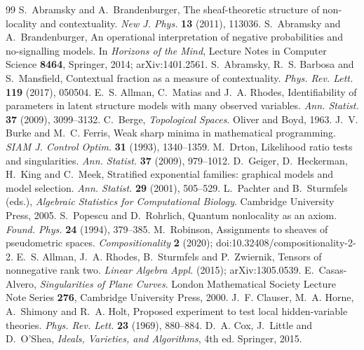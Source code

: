 \documentclass[11pt]{article}
\theoremstyle{definition}\newtheorem{definition}[theorem]{Definition}\newtheorem{remark}[theorem]{Remark}\newtheorem{example}[theorem]{Example}
\begin{document}
\par\endgroup
\begin{thebibliography}{99}\small
{} S.~Abramsky and A.~Brandenburger, The sheaf-theoretic structure of non-locality and
  contextuality. \emph{New J. Phys.} \textbf{13} (2011), 113036.
 S.~Abramsky and A.~Brandenburger, An operational interpretation of negative probabilities and
  no-signalling models. In \emph{Horizons of the Mind}, Lecture Notes in Computer Science \textbf{8464}, Springer, 2014;
  arXiv:1401.2561.
 S.~Abramsky, R.~S. Barbosa and S.~Mansfield, Contextual fraction as a measure of
  contextuality. \emph{Phys. Rev. Lett.} \textbf{119} (2017), 050504.
 E.~S. Allman, C.~Matias and J.~A. Rhodes, Identifiability of parameters in latent structure models with
  many observed variables. \emph{Ann. Statist.} \textbf{37} (2009), 3099--3132.
 C.~Berge, \emph{Topological Spaces}. Oliver and Boyd, 1963.
 J.~V. Burke and M.~C. Ferris, Weak sharp minima in mathematical programming. \emph{SIAM J. Control
  Optim.} \textbf{31} (1993), 1340--1359.
 M.~Drton, Likelihood ratio tests and singularities. \emph{Ann. Statist.} \textbf{37} (2009), 979--1012.
 D.~Geiger, D.~Heckerman, H.~King and C.~Meek, Stratified exponential families: graphical models and model
  selection. \emph{Ann. Statist.} \textbf{29} (2001), 505--529.
 L.~Pachter and B.~Sturmfels (eds.), \emph{Algebraic Statistics for Computational Biology}. Cambridge
  University Press, 2005.
 S.~Popescu and D.~Rohrlich, Quantum nonlocality as an axiom. \emph{Found. Phys.} \textbf{24}
  (1994), 379--385.
 M.~Robinson, Assignments to sheaves of pseudometric spaces. \emph{Compositionality} \textbf{2} (2020);
  doi:10.32408/compositionality-2-2.
 E.~S. Allman, J.~A. Rhodes, B.~Sturmfels and P.~Zwiernik, Tensors of nonnegative rank two.
  \emph{Linear Algebra Appl.} (2015); arXiv:1305.0539.
 E.~Casas-Alvero, \emph{Singularities of Plane Curves}. London Mathematical Society Lecture Note Series
  \textbf{276}, Cambridge University Press, 2000.
 J.~F. Clauser, M.~A. Horne, A.~Shimony and R.~A. Holt, Proposed experiment to test local hidden-variable theories.
  \emph{Phys. Rev. Lett.} \textbf{23} (1969), 880--884.
 D.~A. Cox, J.~Little and D.~O'Shea, \emph{Ideals, Varieties, and Algorithms}, 4th ed. Springer, 2015.

\end{thebibliography}
\end{document}

